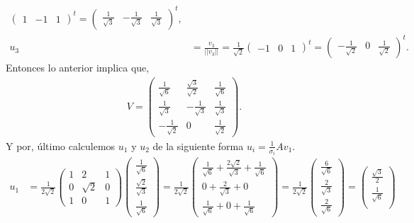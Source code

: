 \documentclass[11pt,letterpaper]{article}
\begin{document}
\begin{enumerate}
\begin{align*}
\begin{pmatrix}
1 & -1 & 1
\end{pmatrix}^t = \begin{pmatrix}
\frac{1}{\sqrt{3}} & -\frac{1}{\sqrt{3}} & \frac{1}{\sqrt{3}}
\end{pmatrix}^t,\\
u_3&= \frac{v_3}{||v_3||} =\frac{1}{\sqrt{2}} \begin{pmatrix}
-1 & 0 & 1
\end{pmatrix}^t = \begin{pmatrix}
 -\frac{1}{\sqrt{2}} & 0 & \frac{1}{\sqrt{2}}
\end{pmatrix}^t.
\end{align*}
Entonces lo anterior implica que,
\begin{align*}
V= \begin{pmatrix}
\frac{1}{\sqrt{6}} & \frac{\sqrt{3}}{\sqrt{2}} & \frac{1}{\sqrt{6}}\\
\frac{1}{\sqrt{3}} & -\frac{1}{\sqrt{3}} & \frac{1}{\sqrt{3}}\\
-\frac{1}{\sqrt{2}} & 0 & \frac{1}{\sqrt{2}}
\end{pmatrix}.
\end{align*}
Y por, último calculemos $u_1$ y $u_2$ de la siguiente forma
$u_i= \frac{1}{\sigma_i} A v_1.$
\begin{align*}
u_1&=\frac{1}{2\sqrt{2}} \begin{pmatrix}
1 & 2 & 1\\
0 & \sqrt{2} & 0\\
1 & 0 & 1
\end{pmatrix}\begin{pmatrix}
\frac{1}{\sqrt{6}} \\ \frac{\sqrt{2}}{\sqrt{3}} \\ \frac{1}{\sqrt{6}}
\end{pmatrix}= \frac{1}{2\sqrt{2}} \begin{pmatrix}
\frac{1}{\sqrt{6}}  + \frac{2\sqrt{2}}{\sqrt{3}}+\frac{1}{\sqrt{6}} \\
0+\frac{2}{\sqrt{3}} +0\\
\frac{1}{\sqrt{6}} +0 +\frac{1}{\sqrt{6}} 
\end{pmatrix}= \frac{1}{2\sqrt{2}} \begin{pmatrix}
\frac{6}{\sqrt{6}}\\
\frac{2}{\sqrt{3}}\\
\frac{2}{\sqrt{6}}
\end{pmatrix}=\begin{pmatrix}
\frac{\sqrt{3}}{2}\\
\frac{1}{\sqrt{6}}\\

\end{pmatrix}
\end{align*}
\end{enumerate}
\end{document}
